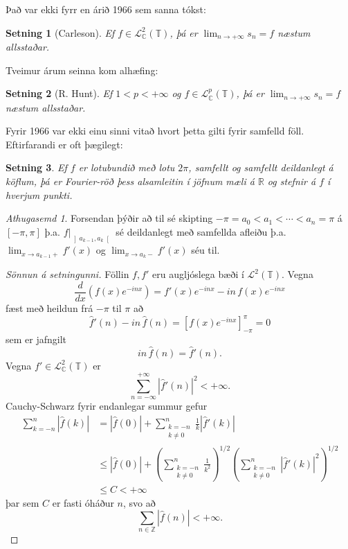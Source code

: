 \documentclass[a4paper,icelandic,11pt]{book}
\theoremstyle{plain}      \newtheorem{setn}{Setning}[chapter]
\theoremstyle{definition} \newtheorem{skilgr}[setn]{Skilgreining}
\theoremstyle{remark}     \newtheorem*{ath}{Athugasemd}
\newcommand{\R}{\mathbb R}
\newcommand{\C}{\mathbb C}
\newcommand{\Z}{\mathbb Z}
\begin{document}
Það var ekki fyrr en árið 1966 sem sanna tókst:
\begin{setn}
  [Carleson]
  Ef $f\in\mathcal L_{\C}^{2}(\mathbb T)$, þá er
  $\lim_{n\to+\infty}s_{n}=f$ næstum allsstaðar.
\end{setn}
Tveimur árum seinna kom alhæfing:
\begin{setn}
  [R. Hunt]  Ef $1 < p < +\infty$ og $f\in\mathcal
  L_{\C}^{p}(\mathbb T)$, þá er $\lim_{n\to+\infty}s_{n}=f$ næstum
  allsstaðar.
\end{setn}
Fyrir 1966 var ekki einu sinni vitað hvort þetta gilti fyrir samfelld
föll. Eftirfarandi er oft þægilegt:
\begin{setn}
  Ef $f$ er lotubundið með lotu $2\pi$, samfellt og samfellt
  deildanlegt á köflum, þá er Fourier-röð þess alsamleitin í jöfnum
  mæli á $\R$ og stefnir á $f$ í hverjum punkti.
\end{setn}
\begin{ath}
  Forsendan þýðir að til sé skipting
  $-\pi=a_{0}<a_{1}<\cdots<a_{n}=\pi$ á $[-\pi,\pi]$
  þ.a. $f|_{\left]a_{k-1},a_{k}\right[}$ sé deildanlegt með samfellda
  afleiðu þ.a. $\lim_{x\to a_{k-1}+}f'(x)$ og
  $\lim_{x\to{a_{k}-}}f'(x)$ séu til.
\end{ath}
\begin{proof}
  [Sönnun á setningunni]
  Föllin $f,f'$ eru augljóslega bæði í $\mathcal L^{2}(\mathbb
  T)$. Vegna 
  \[
  \frac{d}{dx}(f(x)e^{-inx})
  = f'(x)e^{-inx} - in\,f(x)e^{-inx}
  \]
  fæst með heildun frá $-\pi$ til $\pi$ að 
  \[
  \hat f'(n)
  - in\,\hat f(n)
  = \left[ f(x) e^{-inx} \right]_{-\pi}^{\pi}
  = 0
  \]
  sem er jafngilt 
  \[
  in\,\hat f(n) = \hat f'(n).
  \]
  Vegna $f'\in\mathcal L_{\C}^{2}(\mathbb T)$ er 
  \[
  \sum_{n=-\infty}^{+\infty}\left|
    \hat f'(n)
  \right|^{2}
  < +\infty.
  \]
  Cauchy-Schwarz fyrir endanlegar summur gefur
  \begin{align*}
    \sum_{k=-n}^{n}\left|\hat f(k)\right|
    &= \left| \hat f(0) \right|
    + \sum_{\substack{k=-n\\k\ne0}}^{n}\frac{1}{k}\left|
      \hat f'(k)
    \right|
    \\
    &\le \left| \hat f(0) \right|
    + \left(
      \sum_{\substack{k=-n\\k\ne0}}^{n}
      \frac{1}{k^{2}}
    \right)^{1/2}
    \left(
      \sum_{\substack{k=-n\\k\ne0}}^{n}
      \left|
        \hat f'(k)
      \right|^{2}
    \right)^{1/2}
    \\
    &\le C < +\infty
  \end{align*}
  þar sem $C$ er fasti óháður $n$, svo að 
  \[
  \sum_{n\in\Z} \left|
    \hat f(n)
  \right| < +\infty.
  \]
\end{proof}
\end{document}

